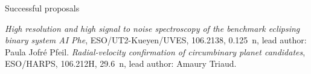 \begin{rubric}{Successful proposals}

\entry*[2020]
    \textit{High resolution and high signal to noise spectroscopy of the benchmark eclipsing binary system AI Phe}, ESO/UT2-Kueyen/UVES, 106.2138, 0.125~n, lead author: Paula Jofr\'{e} Pfeil.
\entry*[2020]
    \textit{Radial-velocity confirmation of circumbinary planet candidates}, ESO/HARPS, 106.212H, 29.6~n, lead author: Amaury Triaud.
    
\end{rubric}